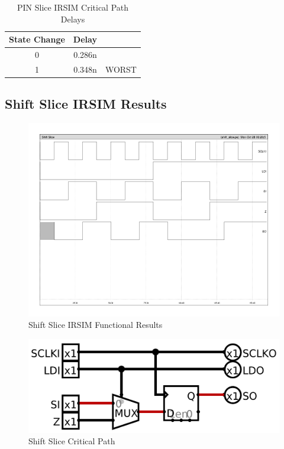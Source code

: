         \begin{table}[H]
            \centering
            \begin{tabular}{crc}
                \toprule
                \textbf{State Change} & \textbf{Delay} & \\
                \midrule
                0 & 0.286n & \\
                1 & 0.348n & WORST \\
                \bottomrule
            \end{tabular}
            \caption{PIN Slice IRSIM Critical Path Delays}
        \end{table}

    \newpage
    \subsection{Shift Slice IRSIM Results}
        
        \begin{figure}[H]
            \centering
            \includegraphics[width=0.75\linewidth]{../../irsim/shift_slice.png}
            \caption{Shift Slice IRSIM Functional Results}
        \end{figure}
        \begin{figure}[H]
            \centering
            \includegraphics[width=\linewidth]{../../logisim/shift_slice_crit_path.png}
            \caption{Shift Slice Critical Path}
        \end{figure}
